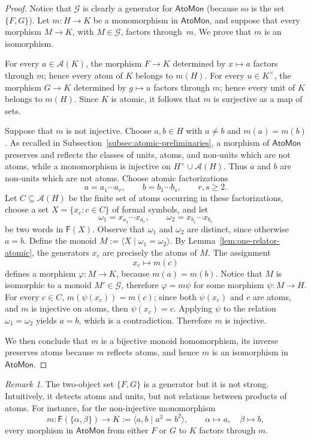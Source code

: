 \documentclass[a4paper,10pt,reqno]{amsart}
\theoremstyle{definition}
\theoremstyle{remark}
\newtheorem{remark}[theorem]{Remark}
\newcommand{\AtoMon}{\mathsf{AtoMon}}
\newcommand{\A}{\mathscr A}
\newcommand{\F}{\mathsf F}
\newcommand{\Cal}[1]{\mathcal{#1}}
\begin{document}
\begin{proof} Notice that $\mathcal G$ is clearly a generator for $\AtoMon$ (because so is the set $\{F,G\}$).
Let $m:H\to K$ be a monomorphism in $\AtoMon$, and suppose that every morphism $M\to K$, with $M\in\mathcal G$, factors through~$m$. We prove that $m$ is an isomorphism.

For every $a\in\A(K)$, the morphism $F\to K$ determined by $x\mapsto a$ factors through $m$; hence every atom of $K$ belongs to $m(H)$.  For every $u\in K^\times$, the morphism $G\to K$ determined by $g\mapsto u$
factors through $m$; hence every unit of $K$ belongs to $m(H)$.  Since $K$ is atomic, it follows that $m$ is surjective as a map of sets.

Suppose that $m$ is not injective. Choose $a,b\in H$ with $a\neq b$ and $m(a)=m(b)$. As recalled in Subsection~\ref{subsec:atomic-preliminaries}, a morphism of $\AtoMon$ preserves and reflects the classes of units, atoms, and non-units which are not atoms, while a monomorphism is injective on $H^\times\cup\A(H)$.  Thus $a$ and $b$ are non-units which are not atoms. Choose atomic factorizations
$$
  a=a_1\cdots a_r,
  \qquad
  b=b_1\cdots b_s,
  \qquad r,s\geq 2.
$$
Let $C\subseteq\A(H)$ be the finite set of atoms occurring in these factorizations, choose a set $X=\{x_c:c\in C\}$ of formal symbols, and let
$$
  \omega_1=x_{a_1}\cdots x_{a_r},
  \qquad
  \omega_2=x_{b_1}\cdots x_{b_s}
$$
be two words in $\F(X)$. Observe that $\omega_1$ and $\omega_2$ are distinct, since otherwise $a=b$.  Define the monoid
$M:=\langle X\mid \omega_1=\omega_2\rangle$. By Lemma~\ref{lem:one-relator-atomic}, the generators $x_c$ are precisely the atoms of $M$.  The assignment
$$
  x_c\mapsto m(c)
$$
defines a morphism $\varphi:M\to K$, because $m(a)=m(b)$. Notice that $M$ is isomorphic to a monoid $M' \in \Cal G$, therefore $\varphi=m\psi$ for some morphism $\psi:M\to H$. For every $c\in C$, $m(\psi(x_c))=m(c)$; since both $\psi(x_c)$ and $c$ are atoms, and $m$ is injective on atoms, then $\psi(x_c)=c$.  Applying $\psi$ to the relation $\omega_1=\omega_2$ yields $a=b$, which is a contradiction.  Therefore $m$ is injective.

We then conclude that $m$ is a bijective monoid homomorphism, its inverse preserves atoms because $m$ reflects atoms, and hence $m$ is an isomorphism in $\AtoMon$.
\end{proof}

\begin{remark}
The two-object set $\{F,G\}$ is a generator but it is not strong. Intuitively, it
detects atoms and units, but not relations between products of atoms.
For instance, for the non-injective monomorphism
$$
  m\colon \F(\{\alpha,\beta\})\to
  K:=\langle a,b\mid a^3=b^2\rangle,
  \qquad \alpha\mapsto a,\quad\beta\mapsto b,
$$
every morphism in $\AtoMon$ from either $F$ or $G$ to $K$ factors through $m$.
\end{remark}
\end{document}
